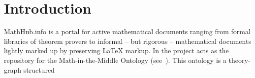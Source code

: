 \section{Introduction}\label{sec:intro}

MathHub.info is a portal for active mathematical documents ranging from formal libraries
of theorem provers to informal -- but rigorous -- mathematical documents lightly marked up
by preserving {\LaTeX} markup. In the \pn project \sys acts as the repository for the
Math-in-the-Middle Ontology (see~\cite{DehKohKon:iop16,ODK-D6.2}). This ontology is a
theory-graph structured 

